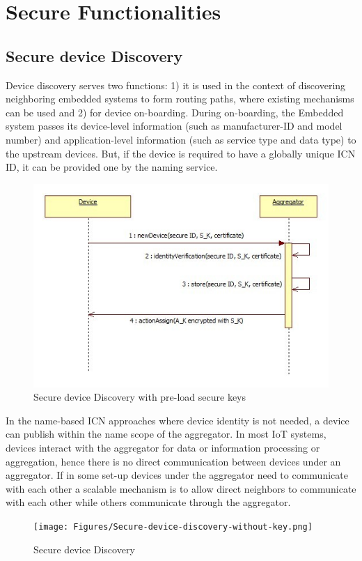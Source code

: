 \section{Secure Functionalities}
\label{sec:technique-in-depth}

\subsection{Secure device Discovery}
\label{subsec: Secure device Discovery}
 Device discovery serves two functions: 1) it is used in the context of discovering neighboring embedded systems to form routing paths, where existing mechanisms can be used and 2) for device on-boarding. During on-boarding, the Embedded system passes its device-level information (such as manufacturer-ID and model number) and application-level information (such as service type and data type) to the upstream devices. But, if the device is required to have a globally unique ICN ID, it can be provided one by the naming service.\par
  \begin{figure}[ht]
	\centering
	\includegraphics[width=\linewidth]{Figures/Secure-device-discovery-with-pre-load-secure-keys.png}
	\caption[]{Secure device Discovery with pre-load secure keys}
	\label{fig:Secure device Discovery with pre-load secure keys}
\end{figure}
 In the name-based ICN approaches where device identity is not needed, a device can publish within the name scope of the aggregator. In most IoT systems, devices interact with the aggregator for data or information processing or aggregation, hence there is no direct communication between devices under an aggregator. If in some set-up devices under the aggregator need to communicate with each other a scalable mechanism is to allow direct neighbors to communicate with each other while others communicate through the aggregator.\par
 \begin{figure}[ht]
	\centering
	\texttt{[image: Figures/Secure-device-discovery-without-key.png]}
	\caption[]{Secure device Discovery}
	\label{fig:Secure device Discovery}
\end{figure}

